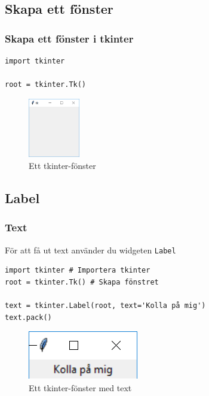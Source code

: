 \documentclass[aspectratio=169]{beamer}
\begin{document}
\subsection{Skapa ett fönster}

\begin{frame}[fragile]
\frametitle{Skapa ett fönster i tkinter}

\begin{lstlisting}
import tkinter

root = tkinter.Tk()
\end{lstlisting}

\begin{figure}
	\begin{center}
	\includegraphics[width=0.2\textwidth]{win1.png}
	\caption{Ett tkinter-fönster}
	\end{center}
\end{figure}

\end{frame}

\subsection{Label}

\begin{frame}[fragile]
\frametitle{Text}

För att få ut text använder du widgeten \texttt{Label}

\begin{lstlisting}
import tkinter # Importera tkinter
root = tkinter.Tk() # Skapa fönstret

text = tkinter.Label(root, text='Kolla på mig')
text.pack() 
\end{lstlisting}

\begin{figure}
\begin{center}
\includegraphics[]{win2.png}
\caption{Ett tkinter-fönster med text}
\end{center}
\end{figure}

\end{frame}
\end{document}
